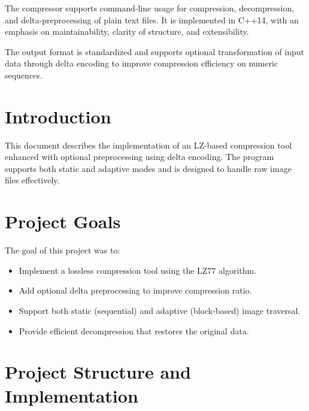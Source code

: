 \documentclass[a4paper,12pt]{article}
\begin{document}
    The compressor supports command-line usage for compression, decompression, and delta-preprocessing of plain text files. It is implemented in C++14, with an emphasis on maintainability, clarity of structure, and extensibility.

    The output format is standardized and supports optional transformation of input data through delta encoding to improve compression efficiency on numeric sequences.



    \section{Introduction}
    This document describes the implementation of an LZ-based compression tool enhanced with optional preprocessing using delta encoding. The program supports both static and adaptive modes and is designed to handle raw image files effectively.



    \section{Project Goals}
    The goal of this project was to:
    \begin{itemize}
        \item Implement a lossless compression tool using the LZ77 algorithm.
        \item Add optional delta preprocessing to improve compression ratio.
        \item Support both static (sequential) and adaptive (block-based) image traversal.
        \item Provide efficient decompression that restores the original data.
    \end{itemize}



    \section{Project Structure and Implementation}
\end{document}
